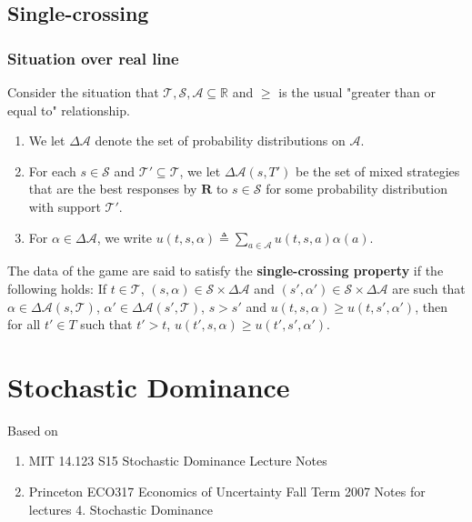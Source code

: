 \documentclass[11pt]{elegantbook}
\begin{document}
\section{Single-crossing}

\subsection{Situation over real line}
Consider the situation that $\mathcal{T},\mathcal{S},\mathcal{A}\subseteq \mathbb{R}$ and $\geq$ is the usual "greater than or equal to" relationship.

\begin{enumerate}
    \item We let $\Delta \mathcal{A}$ denote the set of probability distributions on $\mathcal{A}$.
    \item For each $s\in \mathcal{S}$ and $\mathcal{T}'\subseteq \mathcal{T}$, we let $\Delta\mathcal{A}(s,T')$ be the set of mixed strategies that are the best responses by $\mathbf{R}$ to $s\in \mathcal{S}$ for some probability distribution with support $\mathcal{T}'$.
    \item For $\alpha\in \Delta\mathcal{A}$, we write $u(t,s,\alpha)\triangleq \sum_{a\in \mathcal{A}}u(t,s,a)\alpha(a)$.
\end{enumerate}

\begin{definition}
    \normalfont
    The data of the game are said to satisfy the \textbf{single-crossing property} if the following holds: If $t\in \mathcal{T}$, $(s,\alpha)\in \mathcal{S}\times \Delta\mathcal{A}$ and $(s',\alpha')\in \mathcal{S}\times \Delta\mathcal{A}$ are such that $\alpha\in \Delta\mathcal{A}(s,\mathcal{T})$, $\alpha'\in \Delta\mathcal{A}(s',\mathcal{T})$, $s>s'$ and $u(t,s,\alpha)\geq u(t,s',\alpha')$, then for all $t'\in T$ such that $t'>t$, $u(t',s,\alpha)\geq u(t',s',\alpha')$.
\end{definition}


\chapter{Stochastic Dominance}
Based on
\begin{enumerate}[$\circ$]
    \item MIT 14.123 S15 Stochastic Dominance Lecture Notes
    \item Princeton ECO317 Economics of Uncertainty Fall Term 2007 Notes for lectures 4. Stochastic Dominance
\end{enumerate}
\end{document}
